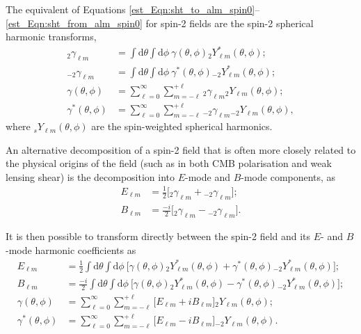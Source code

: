 The equivalent of Equations \eqref{est_Eqn:sht_to_alm_spin0}--\eqref{est_Eqn:sht_from_alm_spin0} for spin-2 fields are the spin-2 spherical harmonic transforms,
\begin{align}
{}_2\gamma_{\ell m} &= \int{\text{d}\theta \int{\text{d}\phi ~
\gamma \left( \theta, \phi \right)
{}_2Y_{\ell m}^* \left( \theta, \phi \right) } };
\\[1em]
{}_{-2}\gamma_{\ell m} &= \int{\text{d}\theta \int{\text{d}\phi ~
\gamma^* \left( \theta, \phi \right)
{}_{-2}Y_{\ell m}^* \left( \theta, \phi \right) } };
\\[1em]
\gamma \left( \theta, \phi \right) &= \sum_{\ell = 0}^\infty
\sum_{m = - \ell}^{+\ell} {}_2\gamma_{\ell m}
{}_2Y_{\ell m} \left( \theta, \phi \right);
\\[1em]
\gamma^* \left( \theta, \phi \right) &= \sum_{\ell = 0}^\infty
\sum_{m = - \ell}^{+\ell} {}_{-2}\gamma_{\ell m}
{}_{-2}Y_{\ell m} \left( \theta, \phi \right),
\end{align}
where ${}_sY_{\ell m} \left( \theta, \phi \right)$ are the spin-weighted spherical harmonics.

An alternative decomposition of a spin-2 field that is often more closely related to the physical origins of the field (such as in both CMB polarisation and weak lensing shear) is the decomposition into $E$-mode and $B$-mode components, as
\begin{align}
E_{\ell m} &= \frac{1}{2} \Big[ {}_2\gamma_{\ell m}
+ {}_{-2}\gamma_{\ell m} \Big];
\\[1em]
B_{\ell m} &= \frac{-i}{2} \Big[ {}_2\gamma_{\ell m}
- {}_{-2}\gamma_{\ell m} \Big].
\end{align}

It is then possible to transform directly between the spin-2 field and its $E$- and $B$-mode harmonic coefficients as
\begin{align}
E_{\ell m} &= \frac{1}{2} \int{\text{d}\theta \int{\text{d}\phi ~
\Big[ \gamma \left( \theta, \phi \right)
{}_2Y_{\ell m}^* \left( \theta, \phi \right)
+ \gamma^* \left( \theta, \phi \right)
{}_{-2}Y_{\ell m}^* \left( \theta, \phi \right) \Big] } };
\\[1em]
B_{\ell m} &= \frac{-i}{2} \int{\text{d}\theta \int{\text{d}\phi ~
\Big[ \gamma \left( \theta, \phi \right)
{}_2Y_{\ell m}^* \left( \theta, \phi \right)
- \gamma^* \left( \theta, \phi \right)
{}_{-2}Y_{\ell m}^* \left( \theta, \phi \right) \Big] } };
\\[1em]
\gamma \left( \theta, \phi \right) &= \sum_{\ell = 0}^\infty
\sum_{m = - \ell}^{+\ell} \Big[ E_{\ell m} + i B_{\ell m} \Big]
{}_2Y_{\ell m} \left( \theta, \phi \right);
\\[1em]
\gamma^* \left( \theta, \phi \right) &= \sum_{\ell = 0}^\infty
\sum_{m = - \ell}^{+\ell} \Big[ E_{\ell m} - i B_{\ell m} \Big]
{}_{-2}Y_{\ell m} \left( \theta, \phi \right).
\end{align}

